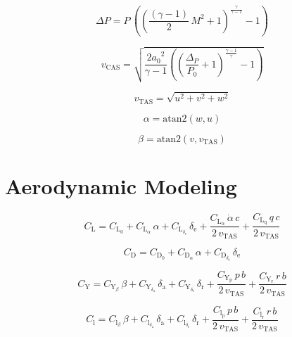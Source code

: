 \documentclass{article}
\begin{document}
\begin{dmath}
\Delta P=P\,\left({\left(\frac{(\gamma-1)}{2}\,M^2+1\right)}^{\frac{\gamma }{\gamma -1}}-1\right)
\end{dmath}

\begin{dmath}
v_{\mathrm{CAS}}=\sqrt{\frac{{2a_{0}}^2}{\gamma -1}\left({\left(\frac{\Delta _{P}}{P_{0}}+1\right)}^{\frac{\gamma -1}{\gamma }}-1\right)}
\end{dmath}

\begin{dmath}
v_{\mathrm{TAS}}=\sqrt{u^2+v^2+w^2}
\end{dmath}

\begin{dmath}
\alpha=\mathrm{atan2}\left(w,u\right)
\end{dmath}

\begin{dmath}
\beta=\mathrm{atan2}\left(v,v_{\mathrm{TAS}}\right)
\end{dmath}

\newpage

\section{Aerodynamic Modeling}

\begin{dmath}
C_{\mathrm{L}}=C_{\mathrm{L}_{\mathrm{0}}}+C_{\mathrm{L}_{\alpha} }\,\alpha +C_{\mathrm{L}_{\delta_{\mathrm{e}}}}\,\delta _{\mathrm{e}}+\frac{C_{\mathrm{L}_{\dot{\alpha }}}\,\dot{\alpha }\,c}{2\,v_{\mathrm{TAS}}}+\frac{C_{\mathrm{L}_{\mathrm{q}}}\,q\,c}{2\,v_{\mathrm{TAS}}}
\end{dmath}

\begin{dmath}
C_{\mathrm{D}}=C_{\mathrm{D}_{\mathrm{0}}}+C_{\mathrm{D}_{\alpha}}\,\alpha + C_{\mathrm{D}_{\delta_{\mathrm{e}}}}\,\delta _{\mathrm{e}}
\end{dmath}

\begin{dmath}
C_{\mathrm{Y}}=C_{\mathrm{Y}_{\beta}}\,\beta +C_{\mathrm{Y}_{\delta_{\mathrm{a}}}}\,\delta _{\mathrm{a}}+C_{\mathrm{Y}_{\delta_{\mathrm{r}}}}\,\delta _{\mathrm{r}}+\frac{C_{\mathrm{Y}_{\mathrm{p}}}\,p\,b}{2\,v_{\mathrm{TAS}}}+\frac{C_{\mathrm{Y}_{\mathrm{r}}}\,r\,b}{2\,v_{\mathrm{TAS}}}
\end{dmath}

\begin{dmath}
C_{\mathrm{l}}=C_{\mathrm{l}_{\beta}}\,\beta +C_{\mathrm{l}_{\delta_{\mathrm{a}}}}\,\delta _{\mathrm{a}}+C_{\mathrm{l}_{\delta_{\mathrm{r}}}}\,\delta _{\mathrm{r}}+\frac{C_{\mathrm{l}_{\mathrm{p}}}\,p\,b}{2\,v_{\mathrm{TAS}}}+\frac{C_{\mathrm{l}_{\mathrm{r}}}\,r\,b}{2\,v_{\mathrm{TAS}}}
\end{dmath}
\end{document}
